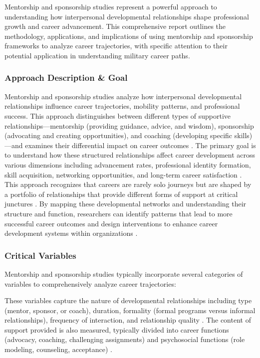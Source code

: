 \documentclass[main.tex]{subfiles}
\begin{document}
Mentorship and sponsorship studies represent a powerful approach to understanding how interpersonal developmental relationships shape professional growth and career advancement. This comprehensive report outlines the methodology, applications, and implications of using mentorship and sponsorship frameworks to analyze career trajectories, with specific attention to their potential application in understanding military career paths.

\subsubsection{Approach Description \& Goal}

Mentorship and sponsorship studies analyze how interpersonal developmental relationships influence career trajectories, mobility patterns, and professional success. This approach distinguishes between different types of supportive relationships—mentorship (providing guidance, advice, and wisdom), sponsorship (advocating and creating opportunities), and coaching (developing specific skills)—and examines their differential impact on career outcomes \cite{alachkar2023sponsor, rsna2021mentorship}. The primary goal is to understand how these structured relationships affect career development across various dimensions including advancement rates, professional identity formation, skill acquisition, networking opportunities, and long-term career satisfaction \cite{dubois2011does, togetherplatform2023mentoring}. This approach recognizes that careers are rarely solo journeys but are shaped by a portfolio of relationships that provide different forms of support at critical junctures \cite{higgins2023celebrating}. By mapping these developmental networks and understanding their structure and function, researchers can identify patterns that lead to more successful career outcomes and design interventions to enhance career development systems within organizations \cite{alachkar2023sponsor}.

\subsubsection{Critical Variables}

Mentorship and sponsorship studies typically incorporate several categories of variables to comprehensively analyze career trajectories:

These variables capture the nature of developmental relationships including type (mentor, sponsor, or coach), duration, formality (formal programs versus informal relationships), frequency of interaction, and relationship quality \cite{alachkar2023sponsor, rsna2021mentorship}. The content of support provided is also measured, typically divided into career functions (advocacy, coaching, challenging assignments) and psychosocial functions (role modeling, counseling, acceptance) \cite{higgins2023celebrating, togetherplatform2023mentoring}.
\end{document}
